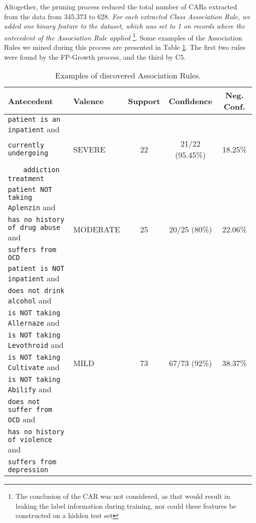  
 Altogether, the pruning process reduced the total number of CARs extracted from the data from 345,373 to 628.
 \textit{For each extracted Class Association Rule, we added one binary feature to the dataset,
 which was set to 1 on records where the antecedent of the Association Rule applied} \footnote{The conclusion of the CAR was not considered, as that would result in leaking the label information during training, nor could these features be constructed on a hidden test set}. Some examples
 of the Association Rules we mined during this process are presented in Table \ref{tab:ARexamples}. The first two rules were found by the \textsf{FP-Growth}
 process, and the third by \textsf{C5}.
 
 \begin{table}
     \centering
     \begin{tabular}{|l|l|c|c|c|}
    \hline
    \textsf{Antecedent}& \textsf{Valence} & \textsf{Support}& \textsf{Confidence}&
    \textsf{Neg. Conf.}\\
    \hline
    \texttt{patient is an inpatient} and  &    &     &   & \\
    \texttt{currently undergoing}& \textsf{SEVERE} & 22 & 21/22 (95.45\%)& 18.25\%\\
    $\ \ \ \ \ $ \texttt{ addiction treatment} & & & & \\
    \hline
    \texttt{patient NOT taking Aplenzin} and &   & & & \\
    \texttt{has no history of drug abuse} and & \textsf{MODERATE} & 25 & 20/25 (80\%) & 22.06\%\\
    \texttt{suffers from OCD} & & & & \\
    \hline
    \texttt{patient is NOT inpatient} and  & & & & \\
    \texttt{does not drink alcohol} and  & & & & \\
    \texttt{is NOT taking Allernaze} and  & & & & \\
    \texttt{is NOT taking Levothroid} and  & & & & \\
    \texttt{is NOT taking Cultivate} and & \textsf{MILD} & 73 & 67/73 (92\%)& 38.37\%\\
    \texttt{is NOT taking Abilify} and  & & & & \\
    \texttt{does not suffer from OCD} and  & & & & \\
    \texttt{has no history of violence} and & & & & \\
    \texttt{suffers from depression} & & & & \\
    \hline
     \end{tabular}
     \caption{Examples of discovered Association Rules.}
     \label{tab:ARexamples}
 \end{table}
 